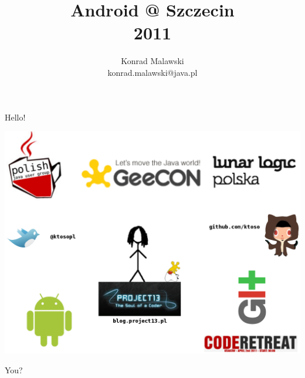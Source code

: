 \documentclass{beamer}
\title{Android @ Szczecin \\ 2011}
\author{Konrad Malawski \\ konrad.malawski@java.pl}
\begin{document}
\begin{frame}
\titlepage
\end{frame}

\begin{frame}
 \begin{center}
  \Huge{Hello!}
 \end{center}

\end{frame}



\begin{frame}
  \centering
  \includegraphics[width=\textwidth,height=\textheight]{images/about_me_slide}
\end{frame}

\begin{frame}
 \begin{center}
  \Huge{You?}
 \end{center}

\end{frame}
\end{document}
